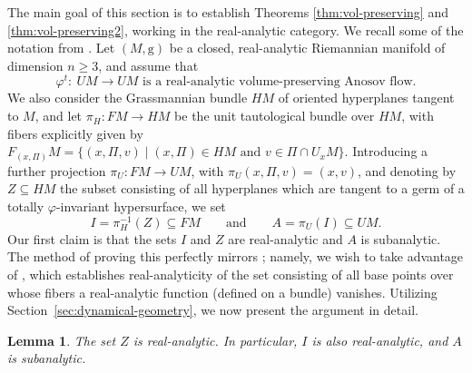 \documentclass[10pt,a4paper]{amsart}
\newcommand{\g}{\mathrm{g}}
\numberwithin{equation}{section}
\newtheorem{Lemma}[Theorem]{Lemma}
\theoremstyle{definition}
\begin{document}
The main goal of this section is to establish Theorems \ref{thm:vol-preserving} and \ref{thm:vol-preserving2}, working in the real-analytic category. We recall some of the notation from \cite{filip2024finiteness}. Let $(M,\g)$ be a closed, real-analytic Riemannian manifold of dimension $n\geq 3$, and assume that \begin{equation}\label{phi-assumptions}
 \text{$\varphi^t \colon \ UM \rightarrow UM$ is a real-analytic volume-preserving Anosov flow.}
\end{equation}
We also consider the Grassmannian bundle $HM$ of oriented hyperplanes tangent to $M$, and let \mbox{$\pi_H \colon FM \rightarrow HM$} be the unit tautological bundle over $HM$, with fibers explicitly given by $F_{(x, \Pi)}M = \{(x,\Pi,v) \mid (x,\Pi) \in HM \mbox{ and } v \in \Pi \cap U_xM\}$. Introducing a further projection $\pi_U \colon FM \rightarrow UM$, with $\pi_U(x,\Pi,v)=(x,v)$,
and denoting by $Z \subseteq HM$ the subset consisting of all hyperplanes which are tangent to a germ of a totally $\varphi$-invariant hypersurface, we set
\begin{equation}\label{I-and-A} I =\pi_H^{-1}(Z) \subseteq FM \qquad\mbox{and}\qquad A = \pi_U(I)\subseteq UM. \end{equation}
Our first claim is that the sets $I$ and $Z$ are real-analytic and $A$ is subanalytic. The method of proving this perfectly mirrors \cite[Corollary 3.2.3]{filip2024finiteness}; namely, we wish to take advantage of \cite[Lemma~3.2.2]{filip2024finiteness}, which establishes real-analyticity of the set consisting of all base points over whose fibers a real-analytic function (defined on a bundle) vanishes. Utilizing Section~\ref{sec:dynamical-geometry},
we now present the argument in detail.

\begin{Lemma}
 The set $Z$ is real-analytic. In particular, $I$ is also real-analytic, and $A$ is subanalytic.
\end{Lemma}
\end{document}
